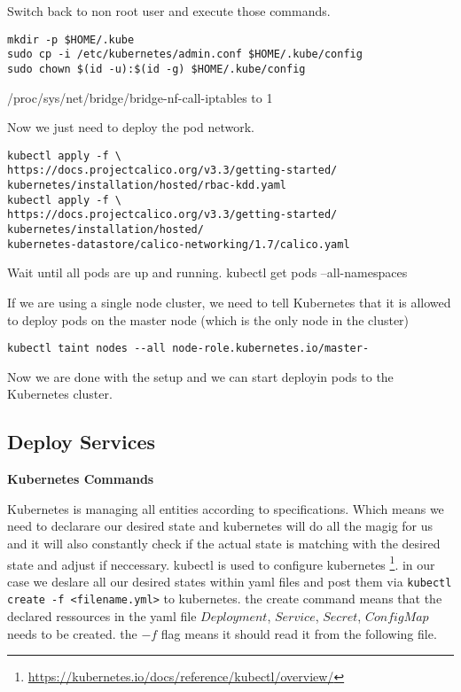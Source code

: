 Switch back to non root user and execute those commands.

\begin{verbatim}
mkdir -p $HOME/.kube
sudo cp -i /etc/kubernetes/admin.conf $HOME/.kube/config
sudo chown $(id -u):$(id -g) $HOME/.kube/config
\end{verbatim}

/proc/sys/net/bridge/bridge-nf-call-iptables to 1

Now we just need to deploy the pod network.
\begin{verbatim}
kubectl apply -f \
https://docs.projectcalico.org/v3.3/getting-started/
kubernetes/installation/hosted/rbac-kdd.yaml
kubectl apply -f \
https://docs.projectcalico.org/v3.3/getting-started/
kubernetes/installation/hosted/
kubernetes-datastore/calico-networking/1.7/calico.yaml
\end{verbatim}

Wait until all pods are up and running.
kubectl get pods --all-namespaces

If we are using a single node cluster, we need to tell Kubernetes that it is allowed to deploy pods on the master node (which is the only node in the cluster)
\begin{verbatim}
kubectl taint nodes --all node-role.kubernetes.io/master-
\end{verbatim}

Now we are done with the setup and we can start deployin pods to the Kubernetes cluster.

\subsection{Deploy Services}

\textbf{Kubernetes Commands}

Kubernetes is managing all entities according to specifications. Which means we need to declarare our desired state and kubernetes will do all the magig for us and it will also constantly check if the actual state is matching with the desired state and adjust if neccessary.
kubectl is used to configure kubernetes \footnote{\url{https://kubernetes.io/docs/reference/kubectl/overview/}}.
in our case we deslare all our desired states within yaml files and post them via \texttt{kubectl create -f <filename.yml>} to kubernetes.
the create command means that the declared ressources in the yaml file $Deployment$, $Service$, $Secret$, $ConfigMap$ needs to be created. the $-f$ flag means it should read it from the following file.

